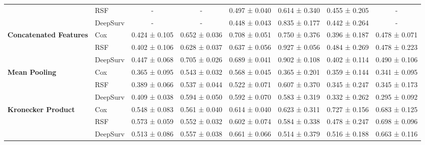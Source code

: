 \begin{sidewaystable}[htbp]
\begin{tabular}{@{}llcccccc@{}}
        & RSF & - & - & 0.497 ± 0.040 & 0.614 ± 0.340 & 0.455 ± 0.205 & - \\
        & DeepSurv & - & - & 0.448 ± 0.043 & 0.835 ± 0.177 & 0.442 ± 0.264 & - \\
        \midrule
        \multirow{3}{*}{\textbf{Concatenated Features}} & Cox & 0.424 ± 0.105 & 0.652 ± 0.036 & 0.708 ± 0.051 & 0.750 ± 0.376 & 0.396 ± 0.187 & 0.478 ± 0.071 \\
        & RSF & 0.402 ± 0.106 & 0.628 ± 0.037 & 0.637 ± 0.056 & 0.927 ± 0.056 & 0.484 ± 0.269 & 0.478 ± 0.223 \\
        & DeepSurv & 0.447 ± 0.068 & 0.705 ± 0.026 & 0.689 ± 0.041 & 0.902 ± 0.108 & 0.402 ± 0.114 & 0.490 ± 0.106 \\
        \midrule
        \multirow{3}{*}{\textbf{Mean Pooling}} & Cox & 0.365 ± 0.095 & 0.543 ± 0.032 & 0.568 ± 0.045 & 0.365 ± 0.201 & 0.359 ± 0.144 & 0.341 ± 0.095 \\
        & RSF & 0.389 ± 0.066 & 0.537 ± 0.044 & 0.522 ± 0.071 & 0.607 ± 0.370 & 0.345 ± 0.247 & 0.345 ± 0.173 \\
        & DeepSurv & 0.409 ± 0.038 & 0.594 ± 0.050 & 0.592 ± 0.070 & 0.583 ± 0.319 & 0.332 ± 0.262 & 0.295 ± 0.092 \\
        \midrule
        \multirow{3}{*}{\textbf{Kronecker Product}} & Cox & 0.548 ± 0.083 & 0.561 ± 0.040 & 0.614 ± 0.040 & 0.623 ± 0.311 & 0.727 ± 0.156 & 0.683 ± 0.125 \\
        & RSF & 0.573 ± 0.059 & 0.552 ± 0.032 & 0.602 ± 0.074 & 0.584 ± 0.338 & 0.478 ± 0.247 & 0.698 ± 0.096 \\
        & DeepSurv & 0.513 ± 0.086 & 0.557 ± 0.038 & 0.661 ± 0.066 & 0.514 ± 0.379 & 0.516 ± 0.188 & 0.663 ± 0.116 \\
        \bottomrule
    \end{tabular}
\end{sidewaystable}

